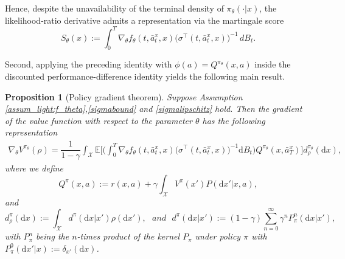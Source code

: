 \documentclass{article}
\newtheorem{prop}[thm]{Proposition}
\newcommand{\1}{\mathbbm{1}}
\numberwithin{equation}{section}
\def\cX{\mathcal{X}}
\def\d{{\mathrm{d}}}
\def\sE{{\mathbb{E}}}
\begin{document}
Hence, despite the unavailability of the terminal density of \(\pi_\theta(\cdot|x)\),
the likelihood-ratio derivative admits a representation via the martingale score
\[
S_\theta(x):=
\int_0^T
\nabla_\theta f_\theta(t,\bar a_t^x,x)
\big(\sigma^\top(t,\bar a_t^x,x)\big)^{-1}\,dB_t .
\]

\medskip

Second, applying the preceding identity with \(\phi(a)=Q^{\pi_\theta}(x,a)\) inside the discounted performance-difference identity yields the following main result.

\begin{prop}[Policy gradient theorem]\label{prop:policygradient}
    Suppose Assumption \ref{assum_light:f_theta},\eqref{sigmabound} and \eqref{sigmalipschitz} hold. Then the gradient of the value function with respect to the parameter $\theta$ has the following representation 
    \begin{align}
    \nabla_\theta V^{\pi_\theta}(\rho)=\dfrac{1}{1-\gamma}\int_\cX\sE\bigg[\bigg(\int_0^T{\nabla_\theta f_\theta(t,\bar a_t^x,x)}\big(\sigma^\top(t,\bar{a}^x_t,x)\big)^{-1}\d B_t\bigg)Q^{\pi_{\theta}} (x,\bar a_T^x)
   \bigg]d_\rho^{\pi_\theta} (\d x),
    \end{align}
    where we define $$Q^{\pi}(x,a):=r(x,a)+\gamma\int_\cX V^{\pi}(x')P(\d x'|x,a),$$ 
    and 
    $$d_\rho^{\pi}(\d x):=\int_\cX d^{\pi}(\d x|x')\rho(\d x'), \,\,\textit{ and }\,\, d^{\pi}(\d x|x'):=(1-\gamma)\sum_{n=0}^\infty\gamma^n P_{\pi}^n(\d x|x'),$$
    with $P^n_\pi$ being the $n$-times product of the kernel $P_\pi$ under policy $\pi$ with $P^0_\pi(\d x'|x):= \delta_{x'}(\d x)$. 
\end{prop}


\end{document}
